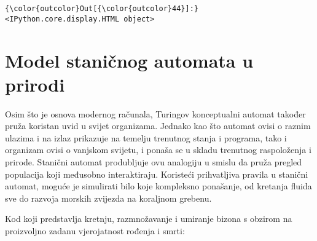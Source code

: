 \documentclass[11pt]{article}
\begin{document}
\begin{Verbatim}[commandchars=\\\{\}]
{\color{outcolor}Out[{\color{outcolor}44}]:} <IPython.core.display.HTML object>
\end{Verbatim}
            
    \section{Model staničnog automata u
prirodi}\label{model-staniux10dnog-automata-u-prirodi}

Osim što je osnova modernog računala, Turingov konceptualni automat
također pruža koristan uvid u svijet organizama. Jednako kao što automat
ovisi o raznim ulazima i na izlaz prikazuje na temelju trenutnog stanja
i programa, tako i organizam ovisi o vanjskom svijetu, i ponaša se u
skladu trenutnog raspoloženja i prirode. Stanični automat produbljuje
ovu analogiju u smislu da pruža pregled populacija koji međusobno
interaktiraju. Koristeći prihvatljiva pravila u stanični automat, moguće
je simulirati bilo koje kompleksno ponašanje, od kretanja fluida sve do
razvoja morskih zvijezda na koraljnom grebenu.

Kod koji predstavlja kretnju, razmnožavanje i umiranje bizona s obzirom
na proizvoljno zadanu vjerojatnost rođenja i smrti:
\end{document}
